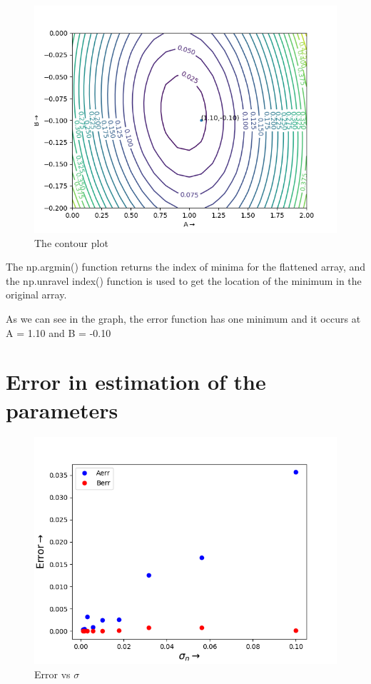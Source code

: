 \documentclass[11pt, a4paper]{article}
\begin{document}
\begin{figure}[!ht]
   	\centering
   	\includegraphics[scale=0.5]{contour_plot.png}  %
   	\caption{The contour plot}
   	\label{fig:fig3}
\end{figure} 
The np.argmin() function returns the index of minima for the flattened
array, and the np.unravel index() function is used to get the location
of the minimum in the original array.


   
 As we can see in the graph, the error function has one minimum and it occurs at A = 1.10 and B = -0.10


\section{Error in estimation of the parameters}

\begin{figure}[!ht]
   	\centering
   	\includegraphics[scale=0.5]{error_vs_sigma_plot.png}  %
   	\caption{Error vs $\sigma$}
   	\label{fig:fig4}
\end{figure}
\end{document}
